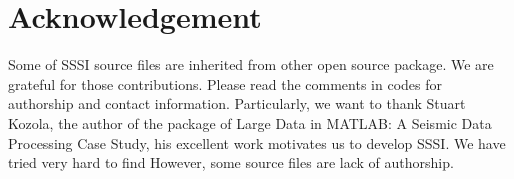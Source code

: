 \documentclass[11pt]{article}
\theoremstyle{plain}
\theoremstyle{definition}
\theoremstyle{remark}
\numberwithin{equation}{section}
\begin{document}
\section*{Acknowledgement}
Some of SSSI source files are inherited from other open source package. We are grateful for those contributions. 
Please read the comments in codes for authorship and contact information. Particularly, we
want to thank Stuart Kozola, the author of the package of Large Data in MATLAB: A Seismic Data Processing Case Study, 
his excellent work motivates us to develop SSSI.  We have tried very hard to find 
However, some source files are lack of authorship.



\end{document}
